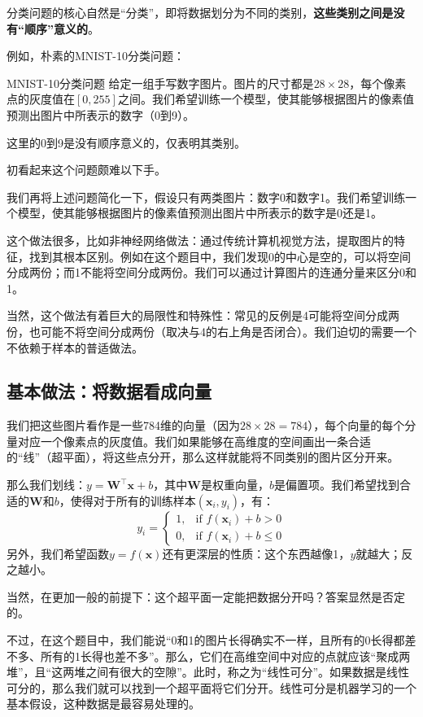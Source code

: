 分类问题的核心自然是“分类”，即将数据划分为不同的类别，\textbf{这些类别之间是没有“顺序”意义的}。

例如，朴素的MNIST-10分类问题：
\begin{framed}{MNIST-10分类问题}
    给定一组手写数字图片。图片的尺寸都是$28\times 28$，每个像素点的灰度值在$[0, 255]$之间。我们希望训练一个模型，使其能够根据图片的像素值预测出图片中所表示的数字（0到9）。

    这里的0到9是没有顺序意义的，仅表明其类别。
\end{framed}

初看起来这个问题颇难以下手。

我们再将上述问题简化一下，假设只有两类图片：数字0和数字1。我们希望训练一个模型，使其能够根据图片的像素值预测出图片中所表示的数字是0还是1。

这个做法很多，比如非神经网络做法：通过传统计算机视觉方法，提取图片的特征，找到其根本区别。例如在这个题目中，我们发现0的中心是空的，可以将空间分成两份；而1不能将空间分成两份。我们可以通过计算图片的连通分量来区分0和1。

当然，这个做法有着巨大的局限性和特殊性：常见的反例是4可能将空间分成两份，也可能不将空间分成两份（取决与4的右上角是否闭合）。我们迫切的需要一个不依赖于样本的普适做法。

\subsection{基本做法：将数据看成向量}

我们把这些图片看作是一些784维的向量（因为$28\times 28=784$），每个向量的每个分量对应一个像素点的灰度值。我们如果能够在高维度的空间画出一条合适的“线”（超平面），将这些点分开，那么这样就能将不同类别的图片区分开来。

那么我们划线：$y = \mathbf{W}^\top \mathbf{x} + b$，其中$\mathbf{W}$是权重向量，$b$是偏置项。我们希望找到合适的$\mathbf{W}$和$b$，使得对于所有的训练样本$(\mathbf{x}_i, y_i)$，有：
\[
    y_i =
    \begin{cases}
        1, & \text{if } f(\mathbf{x}_i) + b > 0 \\
        0, & \text{if } f(\mathbf{x}_i) + b \leq 0
    \end{cases}
\]
另外，我们希望函数$y = f(\mathbf{x})$还有更深层的性质：这个东西越像1，$y$就越大；反之越小。

当然，在更加一般的前提下：这个超平面一定能把数据分开吗？答案显然是否定的。

不过，在这个题目中，我们能说“0和1的图片长得确实不一样，且所有的0长得都差不多、所有的1长得也差不多”。那么，它们在高维空间中对应的点就应该“聚成两堆”，且“这两堆之间有很大的空隙”。此时，称之为“线性可分”。如果数据是线性可分的，那么我们就可以找到一个超平面将它们分开。线性可分是机器学习的一个基本假设，这种数据是最容易处理的。

